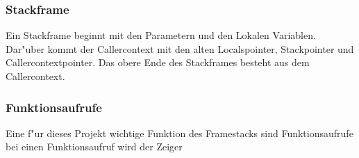 \subsubsection{Stackframe}
Ein Stackframe beginnt mit den Parametern und den Lokalen Variablen.  Dar"uber kommt der Callercontext mit den alten Localspointer, Stackpointer und Callercontextpointer. Das obere Ende des Stackframes besteht aus dem Callercontext. 

\subsubsection{Funktionsaufrufe}

Eine f"ur dieses Projekt wichtige Funktion des Framestacks sind Funktionsaufrufe bei einen Funktionsaufruf wird der Zeiger 



